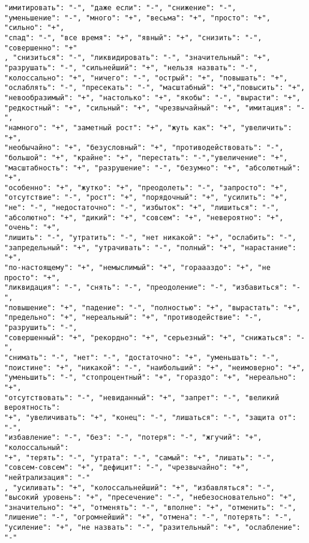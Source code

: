 \begin{lstlisting}[caption="Словосочетания используемые для составления тональных префиксов", label={lst:tonePrefixes}]
"имитировать": "-", "даже если": "-", "снижение": "-",
"уменьшение": "-", "много": "+", "весьма": "+", "просто": "+", "сильно": "+",
"спад": "-", "все время": "+", "явный": "+", "снизить": "-", "совершенно": "+"
, "снизиться": "-", "ликвидировать": "-", "значительный": "+",
"разрушать": "-", "сильнейший": "+", "нельзя назвать": "-",
"колоссально": "+", "ничего": "-", "острый": "+", "повышать": "+",
"ослаблять": "-", "пресекать": "-", "масштабный": "+","повысить": "+",
"невообразимый": "+", "настолько": "+", "якобы": "-", "вырасти": "+",
"редкостный": "+", "сильный": "+", "чрезвычайный": "+", "имитация": "-",
"намного": "+", "заметный рост": "+", "жуть как": "+", "увеличить": "+",
"необычайно": "+", "безусловный": "+", "противодействовать": "-",
"большой": "+", "крайне": "+", "перестать": "-","увеличение": "+",
"масштабность": "+", "разрушение": "-", "безумно": "+", "абсолютный": "+",
"особенно": "+", "жутко": "+", "преодолеть": "-", "запросто": "+",
"отсутствие": "-", "рост": "+", "порядочный": "+", "усилить": "+",
"не": "-", "недостаточно": "-", "избыток": "+", "лишиться": "-",
"абсолютно": "+", "дикий": "+", "совсем": "+", "невероятно": "+", "очень": "+",
"лишить": "-", "утратить": "-", "нет никакой": "+", "ослабить": "-",
"запредельный": "+", "утрачивать": "-", "полный": "+", "нарастание": "+",
"по-настоящему": "+", "немыслимый": "+", "гораааздо": "+", "не просто": "+",
"ликвидация": "-", "снять": "-", "преодоление": "-", "избавиться": "-",
"повышение": "+", "падение": "-", "полностью": "+", "вырастать": "+",
"предельно": "+", "нереальный": "+", "противодействие": "-", "разрушить": "-",
"совершенный": "+", "рекордно": "+", "серьезный": "+", "снижаться": "-",
"снимать": "-", "нет": "-", "достаточно": "+", "уменьшать": "-",
"поистине": "+", "никакой": "-", "наибольший": "+", "неимоверно": "+",
"уменьшить": "-", "стопроцентный": "+", "гораздо": "+", "нереально": "+",
"отсутствовать": "-", "невиданный": "+", "запрет": "-", "великий вероятность":
"+", "увеличивать": "+", "конец": "-", "лишаться": "-", "защита от": "-",
"избавление": "-", "без": "-", "потеря": "-", "жгучий": "+", "колоссальный":
"+", "терять": "-", "утрата": "-", "самый": "+", "лишать": "-",
"совсем-совсем": "+", "дефицит": "-", "чрезвычайно": "+", "нейтрализация": "-"
, "усиливать": "+", "колоссальнейший": "+", "избавляться": "-",
"высокий уровень": "+", "пресечение": "-", "небезосновательно": "+",
"значительно": "+", "отменять": "-", "вполне": "+", "отменить": "-",
"лишение": "-", "огромнейший": "+", "отмена": "-", "потерять": "-",
"усиление": "+", "не назвать": "-", "разительный": "+", "ослабление": "-"
\end{lstlisting}
